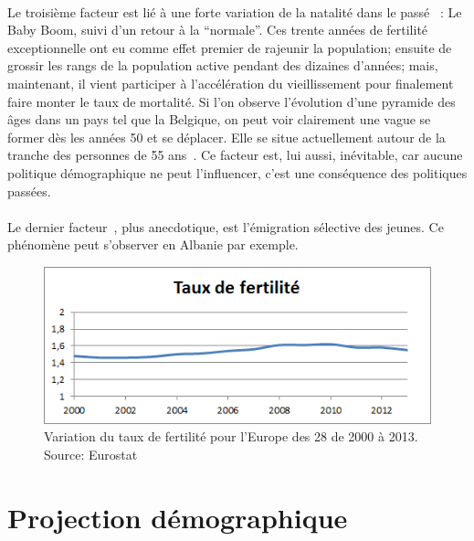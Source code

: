 \paragraph{}Le troisième facteur est lié à une forte variation de la natalité dans le passé~\citep[pp.2]{heran} : Le Baby Boom, suivi d'un retour à la “normale”. Ces trente années de fertilité exceptionnelle ont eu comme effet premier de rajeunir la population; ensuite de grossir les rangs de la population active pendant des dizaines d’années; mais, maintenant, il vient participer à l’accélération du vieillissement pour finalement faire monter le taux de mortalité. Si l'on observe l’évolution d’une pyramide des âges dans un pays tel que la Belgique, on peut voir clairement une vague se former dès les années 50 et se déplacer. Elle se situe actuellement autour de la tranche des personnes de 55 ans~\citep{pyramide-be}. Ce facteur est, lui aussi, inévitable, car aucune politique démographique ne peut l’influencer, c’est une conséquence des politiques passées.

\paragraph{}Le dernier facteur~\citep[pp.3]{heran}, plus anecdotique, est l’émigration sélective des jeunes. Ce phénomène peut s’observer en Albanie par exemple.

\begin{figure}[h!]
    \begin{center}
        \includegraphics[scale=1]{document/fertilite_eu.png}
        \caption{Variation du taux de fertilité pour l'Europe des 28 de 2000 à 2013.  Source: Eurostat~\citep{eurostat_fecondite}}
        \label{fertilite_eu}
    \end{center}
\end{figure}

\section{Projection démographique}
